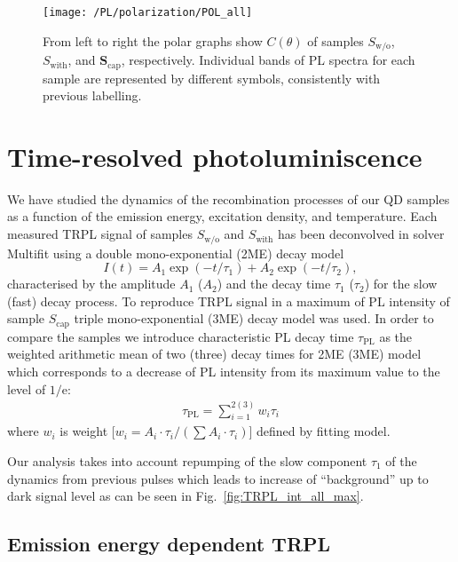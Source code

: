 \begin{figure}
	\centering
	\texttt{[image: /PL/polarization/POL\_all]}
	\caption{From left to right the polar graphs show $C(\theta)$ of samples ${S_\mathrm{w/o}}$, ${S_\mathrm{with}}$, and $\mathbf{S_\mathrm{cap}}$, respectively. Individual bands of PL spectra for each sample are represented by different symbols, consistently with previous labelling.}
	\label{fig:PL_pol_all}
\end{figure}

\newpage
\section{Time-resolved photoluminiscence}
We have studied the dynamics of the recombination processes of our QD samples as a function of the emission energy, excitation density, and temperature. Each measured TRPL signal of samples $S_\mathrm{w/o}$ and $S_\mathrm{with}$ has been deconvolved in solver Multifit using a double mono-exponential (2ME) decay model
%
\begin{equation}
I(t)=A_1\exp(-t/\tau_1)+A_2\exp(-t/\tau_2),
\end{equation}
 characterised by the amplitude $A_1$ ($A_2$) and the decay time $\tau_1$ ($\tau_2$) for the slow (fast) decay process.
 To reproduce TRPL signal in a maximum of PL intensity of sample $S_\mathrm{cap}$ triple mono-exponential (3ME) decay model was used.
 In order to compare the samples we introduce characteristic PL decay time $\tau_\mathrm{PL}$ as the weighted arithmetic mean of two (three) decay times for 2ME (3ME) model which corresponds to a decrease of PL intensity from its maximum value to the level of $1/\mathrm{e}$:
%
\begin{eqnarray}
\tau_\mathrm{PL}=\sum_{i=1}^{2 ( 3) } w_i\tau_i \label{eq:average_time}
\end{eqnarray}
%
where $w_i$ is weight [$w_i={A_i\cdot \tau_i }/{(\sum A_i \cdot \tau_i)}$] defined by fitting model.

Our analysis takes into account repumping of the slow component $\tau_1$ of the dynamics from previous pulses which leads to increase of \enquote{background} up to dark signal level as can be seen in Fig.~\ref{fig:TRPL_int_all_max}.


\subsection{Emission energy dependent TRPL}
%

